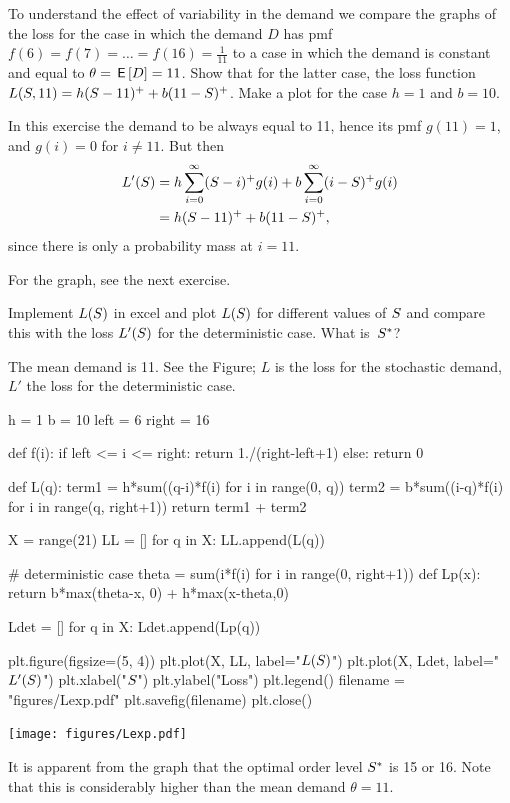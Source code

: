 \begin{exercise}\label{ex:10}
To understand the effect of variability in the demand we compare the graphs of the loss for the case in which the  demand  $D$ has pmf $f(6)=f(7)=\ldots=f(16)=\frac{1}{11}$ to a case in which  the demand is constant and equal to $\theta = \,\mathsf{E}\left[D\right] = 11$. Show that for the latter case, the loss function $L(S, 11) = h(S-11)^+ + b(11-S)^+$. Make a plot for the case $h=1$ and $b=10$. 
  \begin{solution}
In this exercise  the demand to be always equal to 11, hence its pmf $g(11) = 1$, and $g(i)=0$ for $i\neq 11$. But then
\begin{align*}
  L'(S) 
&=h\sum_{i=0}^\infty(S-i)^+ g(i) + b\sum_{i=0}^{\infty}(i-S)^+ g(i) \\
&=h(S-11)^+  + b(11- S)^+,
\end{align*}
since there is only a probability mass at $i=11$.

For the graph, see the next exercise.
  \end{solution}
\end{exercise}

\begin{exercise}[Continuation]\label{ex:55}
Implement $L(S)$ in excel and plot $L(S)$ for different values of $S$ and compare this with the loss $L'(S)$ for the deterministic case. What is~$S^*$?
\begin{solution}
The mean demand is 11. See the Figure; $L$ is the loss for the stochastic demand, $L'$ the loss for the deterministic case.

  
\begin{pycode}[news]
h = 1
b = 10
left = 6
right = 16

def f(i):
    if left <= i <= right:
        return 1./(right-left+1)
    else:
        return 0

def L(q):
    term1 = h*sum((q-i)*f(i) for i in range(0, q))
    term2 = b*sum((i-q)*f(i) for i in range(q, right+1))
    return term1 + term2

X = range(21)
LL = []
for q in X:
    LL.append(L(q))

# deterministic case
theta = sum(i*f(i) for i in range(0, right+1))
def Lp(x):
    return b*max(theta-x, 0) + h*max(x-theta,0)

Ldet = []
for q in X:
    Ldet.append(Lp(q))

plt.figure(figsize=(5, 4))
plt.plot(X, LL, label="$L(S)$")
plt.plot(X, Ldet, label="$L'(S)$")
plt.xlabel("$S$")
plt.ylabel("Loss")
plt.legend()
filename = "figures/Lexp.pdf"
plt.savefig(filename)
plt.close()
\end{pycode}

\begin{center}
\texttt{[image: figures/Lexp.pdf]}
\end{center}


It is apparent from the graph that the optimal order level $S^*$ is 15 or 16. Note that this is considerably higher than the mean demand $\theta = 11$. 
\end{solution}
\end{exercise}
 


